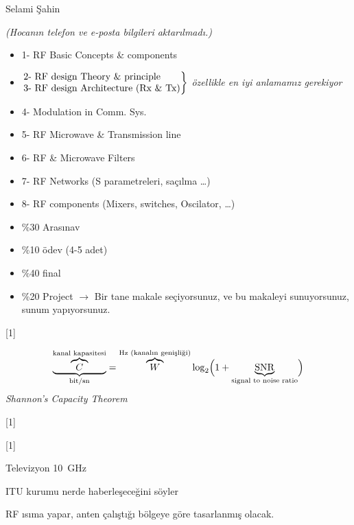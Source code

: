 \documentclass[11pt,a4paper]{article}
\begin{document}

Selami Şahin\par
\textit{(Hocanın telefon ve e-posta bilgileri aktarılmadı.)}

\begin{itemize}[label={},leftmargin=1.5em,itemsep=2pt]
\item 1- RF Basic Concepts \& components
\item $\left.\begin{tabular}[c]{@{}l@{}}2- RF design Theory \& principle\\ 3- RF design Architecture (Rx \& Tx)\end{tabular}\right\}$ \textit{ özellikle en iyi anlamamız gerekiyor}
\item 4- Modulation in Comm. Sys.
\item 5- RF Microwave \& Transmission line
\item 6- RF \& Microwave Filters
\item 7- RF Networks \quad (S parametreleri, saçılma \ldots)
\item 8- RF components \quad (Mixers, switches, Oscilator, \ldots)
\end{itemize}

\begin{itemize}[label={},leftmargin=1.5em,itemsep=2pt]
\item \%30 Arasınav
\item \%10 ödev (4-5 adet)
\item \%40 final
\item \%20 Project $\rightarrow$ Bir tane makale seçiyorsunuz, ve bu makaleyi sunuyorsunuz, sunum yapıyorsunuz.
\end{itemize}

[1]

\[
\underbrace{\overbrace{C}^{\text{kanal kapasitesi}}}_{\text{bit/sn}} = \overbrace{W}^{\text{Hz (kanalın genişliği)}} \log_2\Bigl(1+\underbrace{\mathrm{SNR}}_{\text{signal to noise ratio}}\Bigr)
\]
\textit{Shannon's Capacity Theorem}

[1]

[1]

Televizyon \qty{10}{\giga\hertz}

ITU kurumu nerde haberleşeceğini söyler

RF ısıma yapar, anten çalıştığı bölgeye göre tasarlanmış olacak.
\end{document}
